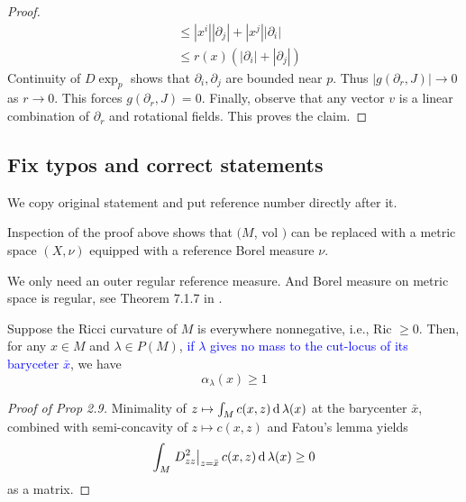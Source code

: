 \begin{proof}
\[\begin{aligned}
                                                                     & \leq \left| x ^ { i } \right| \left| \partial _ { j } \right| + \left| x ^ { j } \right| \left| \partial _ { i } \right| \\
                                                                     & \leq r ( x ) \left( \left| \partial _ { i } \right| + \left| \partial _ { j } \right| \right)\end{aligned} \]
	Continuity of \( D \exp _ { p } \) shows that \( \partial _ { i } , \partial _ { j } \) are bounded near \( p .  \)
	Thus \( \left| g \left( \partial _ { r } , J \right) \right| \rightarrow 0 \) as \( r \rightarrow 0 .  \)
	This forces \( g \left( \partial _ { r } , J \right) = 0 .\)
	Finally, observe that any vector \( v \) is a linear combination of \( \partial _ { r } \) and rotational fields.
	This proves the claim.
\end{proof}

\subsection{Fix typos and correct statements}

We copy original statement and put reference number directly after it.

\begin{rmk}[Remark 2.2]
	Inspection of the proof above shows that \( ( M \), vol \( ) \) can be replaced with a  metric space \( ( X , \nu ) \) equipped with a reference Borel measure \( \nu \).
\end{rmk}

We only need an outer regular reference measure. And Borel measure on metric space is regular, see Theorem 7.1.7 in \cite{Bogachev2007}.

\begin{prop}
	Suppose the Ricci curvature of \( M \) is everywhere nonnegative, i.e., Ric \( \geq 0 . \) Then, for any \( x \in M \) and \( \lambda \in P ( M ) \), \textcolor{blue}{if $\lambda$ gives no mass to the cut-locus of its baryceter $\bar{x}$}, we have
	\[ \alpha _ { \lambda } ( x ) \geq 1 \]
\end{prop}

\begin{proof}[Proof of Prop 2.9]
	Minimality of \( z \mapsto \int _ { M } c ( x , z ) \operatorname{d} \lambda ( x ) \) at the barycenter \( \bar { x } \), combined with semi-concavity of \( z \mapsto c ( x , z ) \) and Fatou's lemma yields
	\[
		\int _ { M } \left. D _ { z z } ^ { 2 } \right| _ { z = \bar { x } } c ( x , z ) \operatorname{d} \lambda ( x ) \geq 0
	\] as a matrix.
\end{proof}

